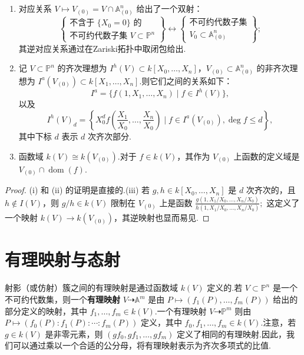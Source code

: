 \begin{proposition}
\begin{enumerate}
    \item[\upshape (i)] 对应关系 \(V \mapsto V_{(0)} = V \cap {\mathbb{A}}_{(0)}^n\) 给出了一个双射：
    \[
    \left\{ \begin{array}{c} \text{不含于 } \{X_0=0\} \text{ 的} \\ \text{不可约代数子集 } V \subset {\mathbb{P}}^n \end{array} \right\} \longleftrightarrow \left\{ \begin{array}{c} \text{不可约代数子集} \\ V_0 \subset {\mathbb{A}}_{(0)}^n \end{array} \right\};
    \]
    其逆对应关系通过在Zariski拓扑中取闭包给出.

    \item[\upshape (ii)] 记 \(V \subset {\mathbb{P}}^n\) 的齐次理想为 \(I^h(V) \subset k[X_0, \ldots, X_n]\)，\(V_{(0)} \subset {\mathbb{A}}_{(0)}^n\) 的非齐次理想为 \(I^a(V_{(0)}) \subset k[X_1, \ldots, X_n]\).则它们之间的关系如下：
    \[
    I^a = \{ f(1, X_1, \ldots, X_n) \mid f \in I^h(V) \},
    \]
    以及
    \[
    I^h(V)_d = \left\{ X_0^d f\left(\frac{X_1}{X_0}, \ldots, \frac{X_n}{X_0}\right) \mid f \in I^a(V_{(0)}), \deg f \le d \right\},
    \]
    其中下标 \(d\) 表示 \(d\) 次齐次部分.

    \item[\upshape (iii)] 函数域 \(k(V) \cong k(V_{(0)})\).对于 \(f \in k(V)\)，其作为 \(V_{(0)}\) 上函数的定义域是 \(V_{(0)} \cap \operatorname{dom}(f)\).
\end{enumerate}
\end{proposition}
\begin{proof}
(i) 和 (ii) 的证明是直接的.(iii) 若 \(g,h \in k[X_0, \ldots, X_n]\) 是 \(d\) 次齐次的，且 \(h \notin I(V)\)，则 \(g/h \in k(V)\) 限制在 \(V_{(0)}\) 上是函数
\(
\frac{g(1, X_1/X_0, \ldots, X_n/X_0)}{h(1, X_1/X_0, \ldots, X_n/X_0)};
\)
这定义了一个映射 \(k(V) \to k(V_{(0)})\)，其逆映射也显而易见.
\end{proof}

\section{有理映射与态射}

射影（或仿射）簇之间的有理映射是通过函数域 \(k(V)\) 定义的.若 \(V \subset {\mathbb{P}}^n\) 是一个不可约代数集，则一个\textbf{有理映射} \(V \dashrightarrow {\mathbb{A}}^m\) 是由 \(P \mapsto (f_1(P), \ldots, f_m(P))\) 给出的部分定义的映射，其中 \(f_1, \ldots, f_m \in k(V)\).一个有理映射 \(V \dashrightarrow {\mathbb{P}}^m\) 则由 \(P \mapsto (f_0(P) : f_1(P) : \cdots : f_m(P))\) 定义，其中 \(f_0, f_1, \ldots, f_m \in k(V)\).注意，若 \(g \in k(V)\) 是非零元素，则 \((gf_0, gf_1, \ldots, gf_m)\) 定义了相同的有理映射.因此，我们可以通过乘以一个合适的公分母，将有理映射表示为齐次多项式的比值.

